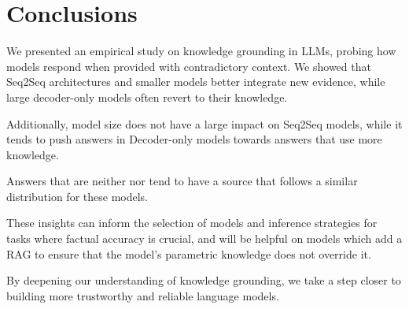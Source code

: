 \section{Conclusions}

We presented an empirical study on knowledge grounding in LLMs, probing how models respond when provided with contradictory context.
We showed that Seq2Seq architectures and smaller models better integrate new evidence, while large decoder-only models often revert to their \Parametric{} knowledge.

Additionally, model size does not have a large impact on Seq2Seq models, while it tends to push answers in Decoder-only models towards answers that use more \Parametric{} knowledge.

Answers that are neither \Parametric{} nor \Contextual{} tend to have a source that follows a similar distribution for these models.

These insights can inform the selection of models and inference strategies for tasks where factual accuracy is crucial, and will be helpful on models which add a RAG to ensure that the model's parametric knowledge does not override it.

By deepening our understanding of knowledge grounding, we take a step closer to building more trustworthy and reliable language models.
